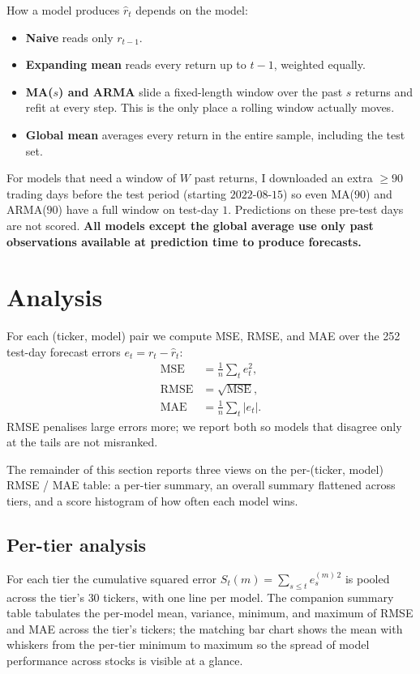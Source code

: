 \documentclass[10pt,a4paper,twocolumn]{article}
\DeclareMathOperator{\RMSE}{RMSE}
\DeclareMathOperator{\MAE}{MAE}
\DeclareMathOperator{\MSE}{MSE}
\begin{document}
How a model produces $\hat r_t$ depends on the model:
\begin{itemize}\itemsep0pt
  \item \textbf{Naive} reads only $r_{t-1}$.
  \item \textbf{Expanding mean} reads every return up to $t-1$, weighted equally.
  \item \textbf{MA($s$) and ARMA} slide a fixed-length window over the past $s$ returns and refit at every step. This is the only place a rolling window actually moves.
  \item \textbf{Global mean} averages every return in the entire sample, including the test set.
\end{itemize}
For models that need a window of $W$ past returns, I downloaded an extra $\geq 90$ trading days before the test period (starting $2022$-$08$-$15$) so even MA($90$) and ARMA($90$) have a full window on test-day $1$. Predictions on these pre-test days are not scored. 
\textbf{All models except the global average use only past observations available at prediction time to produce forecasts.}
\section{Analysis}
\label{sec:analysis}

For each (ticker, model) pair we compute MSE, RMSE, and MAE over the 252 test-day forecast errors $e_t = r_t - \hat r_t$:
\begin{align}
\MSE  &= \tfrac{1}{n}\sum_{t} e_t^2,             \label{eq:mse}\\
\RMSE &= \sqrt{\MSE},                            \label{eq:rmse}\\
\MAE  &= \tfrac{1}{n}\sum_{t} |e_t|.             \label{eq:mae}
\end{align}
RMSE penalises large errors more; we report both so models that disagree only at the tails are not misranked.

The remainder of this section reports three views on the per-(ticker, model) RMSE / MAE table: a per-tier summary, an overall summary flattened across tiers, and a score histogram of how often each model wins.

\subsection{Per-tier analysis}
\label{sec:per-tier}

For each tier the cumulative squared error $S_t(m) = \sum_{s \le t} e_s^{(m)\,2}$ is pooled across the tier's $30$ tickers, with one line per model. The companion summary table tabulates the per-model mean, variance, minimum, and maximum of RMSE and MAE across the tier's tickers; the matching bar chart shows the mean with whiskers from the per-tier minimum to maximum so the spread of model performance across stocks is visible at a glance.
\end{document}
